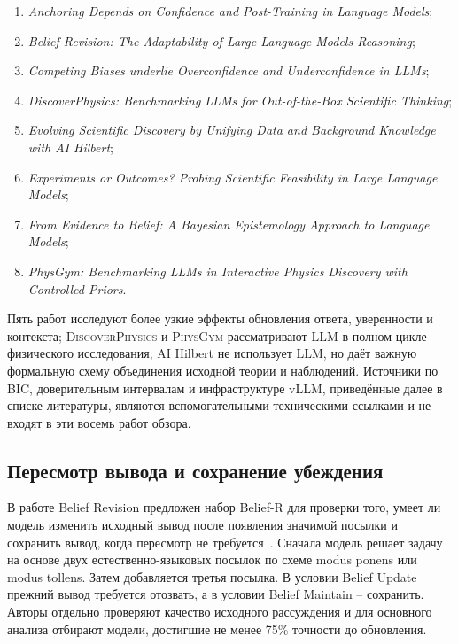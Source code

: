 \documentclass[a4paper,14pt]{extarticle}
\begin{document}
\begin{sloppypar}
\begin{enumerate}
  \item \textit{Anchoring Depends on Confidence and Post-Training in Language Models};
  \item \textit{Belief Revision: The Adaptability of Large Language Models Reasoning};
  \item \textit{Competing Biases underlie Overconfidence and Underconfidence in LLMs};
  \item \textit{DiscoverPhysics: Benchmarking LLMs for Out-of-the-Box Scientific Thinking};
  \item \textit{Evolving Scientific Discovery by Unifying Data and Background Knowledge with AI Hilbert};
  \item \textit{Experiments or Outcomes? Probing Scientific Feasibility in Large Language Models};
  \item \textit{From Evidence to Belief: A Bayesian Epistemology Approach to Language Models};
  \item \textit{PhysGym: Benchmarking LLMs in Interactive Physics Discovery with Controlled Priors}.
\end{enumerate}
\end{sloppypar}

Пять работ исследуют более узкие эффекты обновления ответа, уверенности и контекста; \textsc{DiscoverPhysics} и \textsc{PhysGym} рассматривают LLM в полном цикле физического исследования; AI Hilbert не использует LLM, но даёт важную формальную схему объединения исходной теории и наблюдений. Источники по BIC, доверительным интервалам и инфраструктуре vLLM, приведённые далее в списке литературы, являются вспомогательными техническими ссылками и не входят в эти восемь работ обзора.

\subsection{Пересмотр вывода и сохранение убеждения}

В работе Belief Revision предложен набор Belief-R для проверки того, умеет ли модель изменить исходный вывод после появления значимой посылки и сохранить вывод, когда пересмотр не требуется~\cite{beliefrevision}. Сначала модель решает задачу на основе двух естественно-языковых посылок по схеме modus ponens или modus tollens. Затем добавляется третья посылка. В условии Belief Update прежний вывод требуется отозвать, а в условии Belief Maintain -- сохранить. Авторы отдельно проверяют качество исходного рассуждения и для основного анализа отбирают модели, достигшие не менее 75\% точности до обновления.
\end{document}
